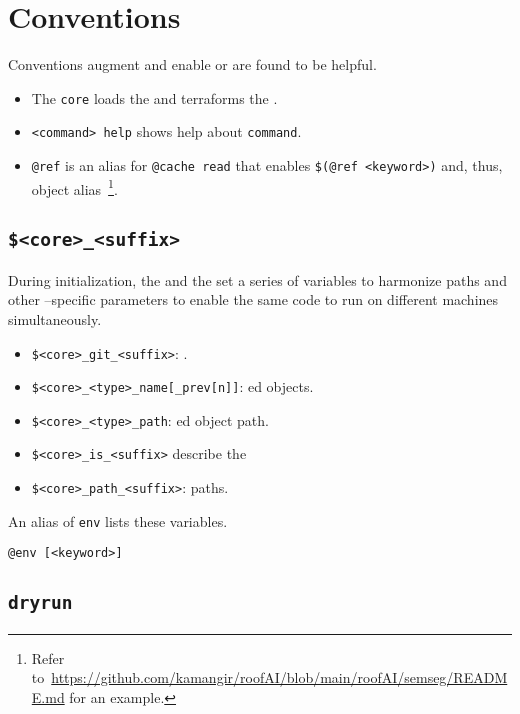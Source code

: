 \section{Conventions}\label{conventions}\label{core}\label{help}

Conventions augment and enable  or are found to be helpful.
%
\begin{itemize}
    \item The \texttt{core} loads the  and terraforms the .
    \item \texttt{<command> help} shows help about \texttt{command}.
    \item \texttt{@ref} is an alias for \texttt{@cache read} that enables \texttt{\$(@ref <keyword>)} and, thus, object alias~\footnote{Refer to~\url{https://github.com/kamangir/roofAI/blob/main/roofAI/semseg/README.md} for an example.}.
\end{itemize}  

\subsection{\texttt{\$<core>\_<suffix>}}\label{awareness}

During initialization, the  and the  set a series of variables to harmonize paths and other --specific parameters to enable the same code to run on different machines simultaneously. 
%
\begin{itemize}
    \item{\texttt{\$<core>\_git\_<suffix>}: .}
    \item{\texttt{\$<core>\_<type>\_name[\_prev[n]]}: ed objects.}
    \item{\texttt{\$<core>\_<type>\_path}: ed object path.}
    \item{\texttt{\$<core>\_is\_<suffix>} describe the }
    \item{\texttt{\$<core>\_path\_<suffix>}: paths.}
\end{itemize}
%
An alias of \texttt{env} lists these variables.
%
\begin{verbatim}
@env [<keyword>]
\end{verbatim}

\subsection{\texttt{dryrun}}\label{dryrun}

